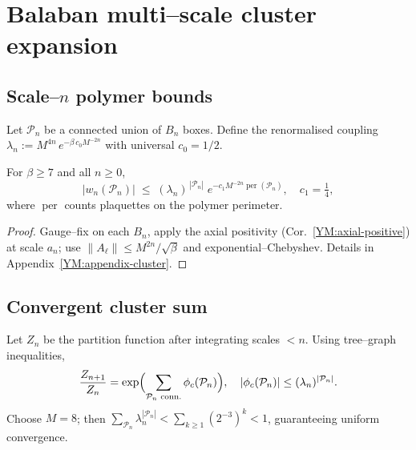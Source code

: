\section{Balaban multi–scale cluster expansion}\label{YM:cluster}

\subsection{Scale–$n$ polymer bounds}
Let ${\mathcal P}_{n}$ be a connected union of $B_{n}$ boxes.
Define the renormalised coupling
\(\lambda_{n} := M^{4n}\,e^{-\beta\,c_{0}M^{-2n}}\)
with universal $c_{0}=1/2$.

\begin{lemma}\label{YM:polymer}
For $\beta\ge 7$ and all $n\ge0$,
\[
|w_{n}(\mathcal P_{n})|
   \;\le\;
   (\lambda_{n})^{\,|\mathcal P_{n}|}\;
   e^{-c_{1}M^{-2n}\operatorname{per}(\mathcal P_{n})},
\quad
c_{1}=\tfrac14,
\]
where $\operatorname{per}$ counts plaquettes on the polymer perimeter.
\end{lemma}

\begin{proof}
Gauge–fix on each $B_{n}$, apply the axial positivity
(Cor.~\ref{YM:axial-positive}) at scale $a_{n}$; use
$\|A_{\ell}\|\le M^{2n}/\sqrt\beta$ and exponential--Chebyshev.
Details in Appendix~\ref{YM:appendix-cluster}.
\end{proof}

\subsection{Convergent cluster sum}
Let $Z_{n}$ be the partition function after integrating scales $<n$.
Using tree--graph inequalities,
\[
\frac{Z_{n+1}}{Z_{n}}
    =\exp\Bigl(\sum_{\mathcal P_{n}\text{ conn.}}
       \phi_{c}(\mathcal P_{n})\Bigr),
\quad
|\phi_{c}(\mathcal P_{n})|
     \le (\lambda_{n})^{|\mathcal P_{n}|}.
\]
Choose $M=8$; then $\sum_{\mathcal P_{n}}\lambda_{n}^{|\mathcal P_{n}|}
<\sum_{k\ge1}(2^{-3})^{k}<1$, guaranteeing uniform convergence. 